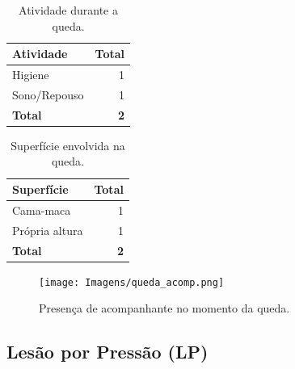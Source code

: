 \documentclass[
  a4paper]{article}
\begin{document}
\begin{table}[H]

\caption{\label{tab:unnamed-chunk-6}Atividade durante a queda.}
\centering
\begin{tabular}[t]{lr}
\toprule
Atividade & Total\\
\midrule
Higiene & 1\\
Sono/Repouso & 1\\
\midrule
\textbf{Total} & \textbf{2}\\
\bottomrule
\end{tabular}
\end{table}

\newpage

\begin{table}[H]

\caption{\label{tab:unnamed-chunk-7}Superfície envolvida na queda.}
\centering
\begin{tabular}[t]{lr}
\toprule
Superfície & Total\\
\midrule
Cama-maca & 1\\
Própria altura & 1\\
\midrule
\textbf{Total} & \textbf{2}\\
\bottomrule
\end{tabular}
\end{table}

\begin{figure}[H]
\caption{Presença de acompanhante no momento da queda.}
\texttt{[image: Imagens/queda\_acomp.png]}
\end{figure}

\newpage

\subsection{Lesão por Pressão (LP)}

\begin{table}[H]

\caption{\label{tab:unnamed-chunk-9}Tipo de Lesão por Pressão.}
\centering
{}
\end{table}
\end{document}
